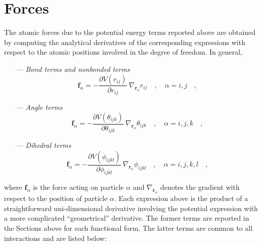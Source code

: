 \documentclass[10pt,a4paper,openany]{memoir}
\numberwithin{equation}{section}
\begin{document}
\section{Forces}
\label{sec:forces}

The atomic forces due to the potential energy terms reported above are
obtained by computing the analytical derivatives of the corresponding
expressions with respect to the atomic positions involved in the
degree of freedom.  In general,

\begin{itemize}
  \item[---]\textit{Bond terms and nonbonded terms}
\begin{equation}
  \label{eq:bond-forces}
  \mathbf{f}_\alpha = -\frac{\partial V(r_{ij})}{\partial r_{ij}}\ \nabla_{\mathbf{r}_{\alpha}} r_{ij}\quad , \quad \alpha = i,j \quad ,
\end{equation}
  \item[---]\textit{Angle terms}
\begin{equation}
  \label{eq:angle-forces}
  \mathbf{f}_\alpha = -\frac{\partial V(\theta_{ijk})}{\partial \theta_{ijk}}\ \nabla_{\mathbf{r}_{\alpha}} \theta_{ijk}\quad , \quad \alpha = i,j,k \quad ,
\end{equation}
  \item[---]\textit{Dihedral terms}
\begin{equation}
  \label{eq:dihedral-forces}
  \mathbf{f}_\alpha = -\frac{\partial V(\phi_{ijkl})}{\partial \phi_{ijkl}}\ \nabla_{\mathbf{r}_{\alpha}} \phi_{ijkl}\quad , \quad \alpha = i,j,k,l \quad ,
\end{equation}
\end{itemize}
where $\mathbf{f}_\alpha$ is the force acting on particle $\alpha$ and
$\nabla_{\mathbf{r}_\alpha}$ denotes the gradient with respect to the
position of particle $\alpha$. Each expression above is the product of
a straightforward uni-dimensional derivative involving the potential
expression with a more complicated ``geometrical'' derivative. The
former terms are reported in the Sections above for each functional
form. The latter terms are common to all interactions and are listed
below:
\end{document}
